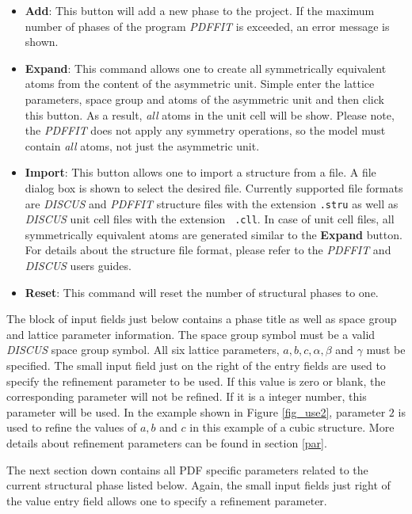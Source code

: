 \begin{itemize}
  \item \textbf{Add}: This button will add a new phase to the
  project. If the maximum number of phases of the program {\it
  PDFFIT} is exceeded, an error message is shown.

  \item \textbf{Expand}: This command allows one to create all
  symmetrically equivalent atoms from the content of the asymmetric
  unit. Simple enter the lattice parameters, space group and atoms
  of the asymmetric unit and then click this button. As a result,
  {\it all} atoms in the unit cell will be show. Please note, the
  {\it PDFFIT} does not apply any symmetry operations, so the model
  must contain {\it all} atoms, not just the asymmetric unit.

  \item \textbf{Import}: This button allows one to import a
  structure from a file. A file dialog box is shown to select the
  desired file. Currently supported file formats are {\it DISCUS}
  and {\it PDFFIT} structure files with the extension {\tt .stru} as
  well as {\it DISCUS} unit cell files with the extension {\tt
  .cll}. In case of unit cell files, all symmetrically equivalent
  atoms are generated similar to the {\bf Expand} button. For
  details about the structure file format, please refer to the {\it
  PDFFIT} and {\it DISCUS} users guides.

  \item \textbf{Reset}: This command will reset the number of
  structural phases to one.
\end{itemize}

The block of input fields just below contains a phase title as well
as space group and lattice parameter information. The space group
symbol must be a valid {\it DISCUS} space group symbol. All six
lattice parameters, $a, b, c, \alpha, \beta$ and $\gamma$ must be
specified. The small input field just on the right of the entry
fields are used to specify the refinement parameter to be used. If
this value is zero or blank, the corresponding parameter will not be
refined. If it is a integer number, this parameter will be used. In
the example shown in Figure \ref{fig_use2}, parameter $2$ is used to
refine the values of $a, b$ and $c$ in this example of a cubic
structure. More details about refinement parameters can be found in
section \ref{par}. \par

The next section down contains all PDF specific parameters related
to the current structural phase listed below. Again, the small input
fields just right of the value entry field allows one to specify a
refinement parameter.

